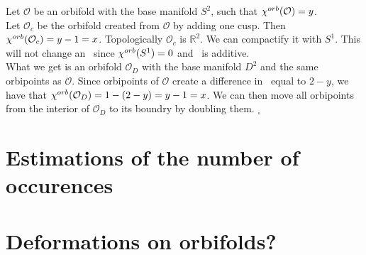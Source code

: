 Let $\mathcal{O}$ be an orbifold with the base manifold $S^2$, such that ${\chi^{orb}(\mathcal{O})} 
= y$. \\
Let $\mathcal{O}_c$ be the orbifold created from $\mathcal{O}$ by adding one cusp. 
Then ${\chi^{orb}(\mathcal{O}_c)} = y - 1 = x$. Topologically $\mathcal{O}_c$ is $\mathbb{R}^2$. 
We can compactify it with $S^1$. This will not change an \Eoc\ since ${\chi^{orb}(S^1)} = 0$ and 
\Eoc\ is additive.
\\ What we get is an orbifold $\mathcal{O}_D$ with the base 
manifold $D^2$ and the same 
orbipoints as $\mathcal{O}$. Since orbipoints of $\mathcal{O}$ create a difference 
in \Eoc\ equal to $2-y$, we have that ${\chi^{orb}(\mathcal{O}_D)} = 1 - (2-y) = y - 1 = x$. 
We can then move all orbipoints from the interior of $\mathcal{O}_D$ to its boundry 
by doubling them. $_\square$



\section{Estimations of the number of occurences}









\section{Deformations on orbifolds?}












